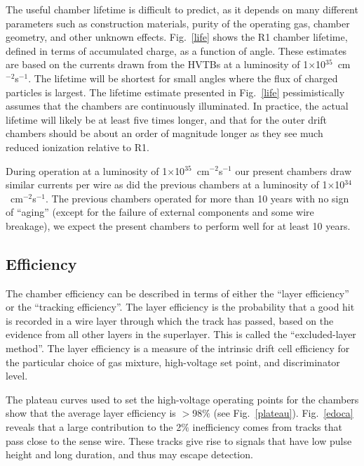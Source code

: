 The useful chamber lifetime is difficult to predict, as it depends on many 
different parameters such as construction materials, purity of the operating gas, 
chamber geometry, and other unknown effects.  Fig.~\ref{life} shows the R1 chamber
lifetime, defined in terms of accumulated charge, as a function of angle.  These 
estimates are based on the currents drawn from the HVTBs at a luminosity of 
1$\times$10$^{35}$~cm$^{-2}$s$^{-1}$.  The lifetime will be shortest for small 
angles where the flux of charged particles is largest.  The lifetime estimate 
presented in Fig.~\ref{life} pessimistically assumes that the chambers are 
continuously illuminated.  In practice, the actual lifetime will likely be at least 
five times longer, and that for the outer drift chambers should be about an order of 
magnitude longer as they see much reduced ionization relative to R1.

During operation at a luminosity of 1$\times$10$^{35}$~cm$^{-2}$s$^{-1}$ our present
chambers draw similar currents per wire as did the previous chambers at a luminosity of 
1$\times$10$^{34}$~cm$^{-2}$s$^{-1}$.
The previous chambers operated for more than 10 years with no 
sign of ``aging'' (except for 
the failure of external components and some wire breakage), we expect the present
chambers to perform well for at least 10 years.


\subsection{Efficiency}

\hskip 0.15in
The chamber efficiency can be described in terms of either the ``layer efficiency'' 
or the ``tracking efficiency''.  The layer efficiency is the probability that a
good hit is recorded in a wire layer through which the track has passed, based on 
the evidence from all other layers in the superlayer.  This is called the 
``excluded-layer method''.  The layer efficiency is a measure of the intrinsic drift 
cell efficiency for the particular choice of gas mixture, high-voltage set point, and 
discriminator level.  

The plateau curves used to set the high-voltage operating points for the chambers 
show that the average layer efficiency is $>$98$\%$ (see Fig.~\ref{plateau}).  
Fig.~\ref{edoca} reveals that a large contribution to the 2$\%$ inefficiency comes 
from tracks that pass close to the sense wire.  These tracks give rise to signals 
that have low pulse height and long duration, and thus may escape detection.

